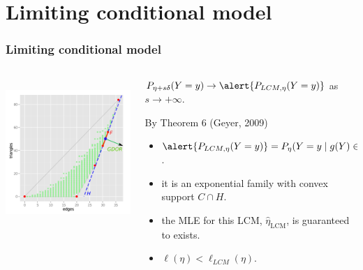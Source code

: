 \documentclass[ 10pt]{beamer}
\newcommand{\etaLCM}{\hat{\eta}_{\textrm{LCM}}}
\begin{document}
\section{Limiting conditional model}
\frame
{
	\frametitle{Limiting conditional model}
\begin{columns}[]
\begin{column}[T]{0.25\textwidth}
\includegraphics[height=2.2in,trim=3.5in 2in 0.15in 0.05in,clip=true]{g9-H.png}
\end{column} %

\begin{column}[t]{0.75\textwidth}
$P_{\eta + s \delta}( Y = y) \to \alert{P_{LCM, \eta}( Y = y)}$ as $s \to +\infty$.
\begin{block}{
By Theorem 6 (Geyer, 2009)}
\begin{itemize}
	\item $\alert{P_{LCM, \eta}( Y = y)} = P_{\eta}( Y =y \mid g(Y) \in H)$.
\vspace{1mm}
	
	\item it is an exponential family with convex support $C \cap H$.
\vspace{1mm}

	\item the MLE for this LCM, $\etaLCM$, is guaranteed to exists.
\vspace{1mm}

	\item $\ell(\eta) < \ell_{LCM}(\eta)$.
\end{itemize}
\end{block}

\end{column}
\end{columns}
}
\end{document}
